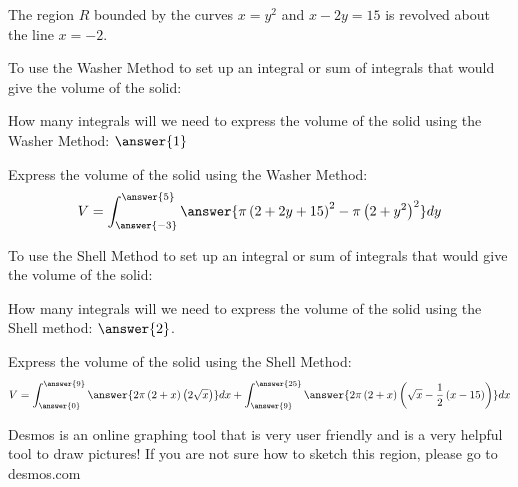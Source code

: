 \documentclass{ximera}
\author{ Jason Miller}
\begin{document}
\begin{exercise}

The region $R$ bounded by the curves $x=y^{2}$ and $x-2y=15$ is revolved about the line $x=-2$. 

To use the Washer Method to set up an integral or sum of integrals that would give the volume of the solid: 

  \begin{multipleChoice}
  \end{multipleChoice}

How many integrals will we need to express the volume of the solid using the Washer Method: $\answer{1}$


\begin{exercise} 
Express the volume of the solid using the Washer Method: 
\[
V=\int_{\answer{-3}}^{\answer{5}} \answer{\pi \left(2+2y+15 \right)^{2}-\pi \left( 2+y^{2}\right)^{2}} dy 
\] 

\begin{exercise} 


To use the Shell Method to set up an integral or sum of integrals that would give the volume of the solid: 

  \begin{multipleChoice}
  \end{multipleChoice}

How many integrals will we need to express the volume of the solid using the Shell method: $\answer{2}$. 


\begin{exercise}
Express the volume of the solid using the Shell Method: 
\[
V=\int_{\answer{0}}^{\answer{9}} \answer{2\pi \left( 2+x \right) \left(2 \sqrt{x} \right)} dx + \int_{\answer{9}}^{\answer{25}} \answer{ 2\pi \left( 2 +x \right) \left( \sqrt{x} - \frac{1}{2}\left( x -15 \right) \right) } dx 
\]

\begin{hint}
Desmos is an online graphing tool that is very user friendly and is a very helpful tool to draw pictures!  If you are not sure how to sketch this region, please go to desmos.com
\end{hint}

\end{exercise}
\end{exercise}
\end{exercise}
\end{exercise}
\end{document}
